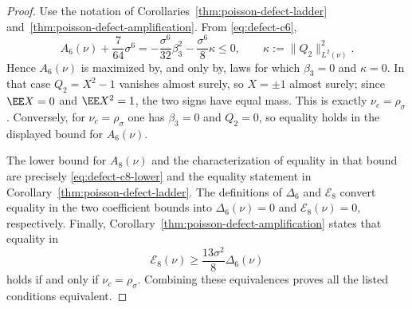 \begin{proof}
Use the notation of Corollaries~\ref{thm:poisson-defect-ladder}
and~\ref{thm:poisson-defect-amplification}.  From
\eqref{eq:defect-c6},
\[
A_6(\nu)+\frac{7}{64}\sigma^6
=-\frac{\sigma^6}{32}\beta_3^2-\frac{\sigma^6}{8}\kappa
\le0,
\qquad
\kappa:=\|Q_2\|_{L^2(\nu)}^2.
\]
Hence \(A_6(\nu)\) is maximized by, and only by, laws for which
$\beta_3=0$ and $\kappa=0$.  In that case
$Q_2=X^2-1$ vanishes almost surely, so $X=\pm1$ almost surely; since
$\EE X=0$ and $\EE X^2=1$, the two signs have equal mass.  This is exactly
$\nu_c=\rho_\sigma$.  Conversely, for $\nu_c=\rho_\sigma$ one has
$\beta_3=0$ and $Q_2=0$, so equality holds in the displayed bound for
\(A_6(\nu)\).

The lower bound for \(A_8(\nu)\) and the characterization of equality
in that bound are precisely \eqref{eq:defect-c8-lower} and the equality
statement in Corollary~\ref{thm:poisson-defect-ladder}.  The definitions of
\(\Delta_6\) and \(\mathcal E_8\) convert equality
in the two coefficient bounds into
\(\Delta_6(\nu)=0\) and
\(\mathcal E_8(\nu)=0\), respectively.  Finally,
Corollary~\ref{thm:poisson-defect-amplification} states that equality in
\[
\mathcal E_8(\nu)\ge
\frac{13\sigma^2}{8}\Delta_6(\nu)
\]
holds if and only if $\nu_c=\rho_\sigma$.  Combining these equivalences
proves all the listed conditions equivalent.
\end{proof}
\endinput
